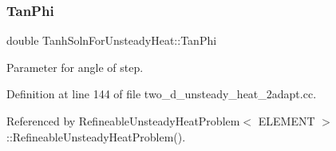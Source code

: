 \mbox{\label{namespaceTanhSolnForUnsteadyHeat_af8d2e06630e8a3f71d1f8dbeecf8a964}} 
\subsubsection{\texorpdfstring{Tan\+Phi}{TanPhi}}
{\footnotesize\ttfamily double Tanh\+Soln\+For\+Unsteady\+Heat\+::\+Tan\+Phi}



Parameter for angle of step. 



Definition at line 144 of file two\+\_\+d\+\_\+unsteady\+\_\+heat\+\_\+2adapt.\+cc.



Referenced by Refineable\+Unsteady\+Heat\+Problem$<$ E\+L\+E\+M\+E\+N\+T $>$\+::\+Refineable\+Unsteady\+Heat\+Problem().

